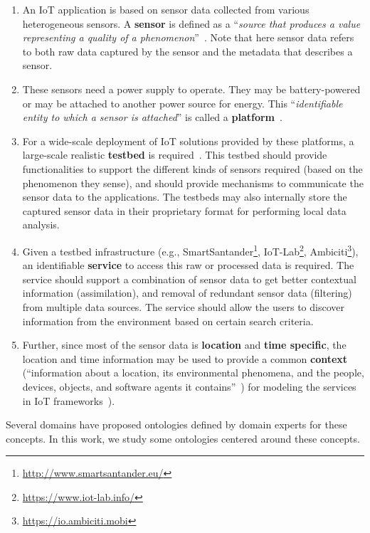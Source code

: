 \documentclass{elsart}  %
\begin{document}
\begin{enumerate}
\item An IoT application is based on sensor data collected from various heterogeneous sensors. A \textbf{sensor} is defined as a ``\emph{source that produces a value representing a quality of a phenomenon}''~\cite{compton2009survey}. Note that here sensor data refers to both raw data captured by the sensor and the metadata that describes a sensor.
\item These sensors need a power supply to operate. They may be battery-powered or may be attached to another power source for energy. This ``\emph{identifiable entity to which a sensor is attached}'' is called a \textbf{platform}~\cite{compton2009survey}.
\item For a wide-scale deployment of IoT solutions provided by these platforms, a large-scale realistic \textbf{testbed} is required~\cite{gluhak2011survey}. This testbed should provide functionalities to support the different kinds of sensors required (based on the phenomenon they sense), and should provide mechanisms to communicate the sensor data to the applications. The testbeds may also internally store the captured sensor data in their proprietary format for performing local data analysis. 
\item Given a testbed infrastructure (e.g., SmartSantander\footnote{\url{http://www.smartsantander.eu/}}, IoT-Lab\footnote{\url{https://www.iot-lab.info/}}, Ambiciti\footnote{\url{https://io.ambiciti.mobi}}), an identifiable \textbf{service} to access this raw or processed data is required. The service should support a combination of sensor data to get better contextual information (assimilation), and removal of redundant sensor data (filtering) from multiple data sources. The service should allow the users to discover information from the environment based on certain search criteria. %
\item Further, since most of the sensor data is \textbf{location} and \textbf{time specific}, the location and time information may be used to provide a common \textbf{context} (``information about a location, its environmental phenomena, and the people, devices, objects, and software agents it contains''~\cite{chen2003ontology}) for modeling the services in IoT frameworks~\cite{flury2004owl}).
\end{enumerate}
    
Several domains have proposed ontologies defined by domain experts for these concepts. In this work, we study some ontologies centered around these concepts.
\end{document}
